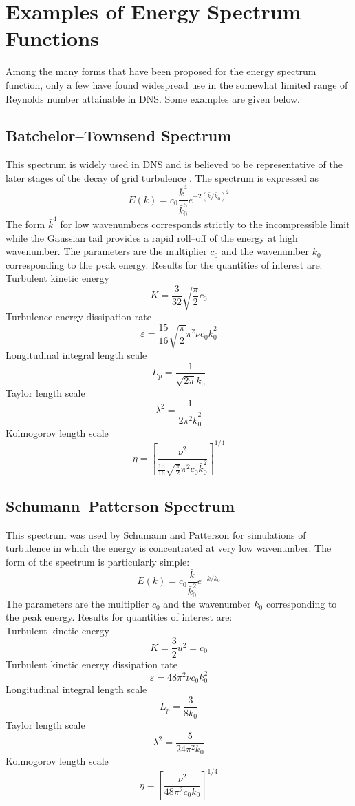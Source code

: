 \documentclass[dvips]{article}
\begin{document}
\section{Examples of Energy Spectrum Functions}
Among the many forms that have been proposed for the energy
spectrum function, only a few have found widespread use in the somewhat
limited range of Reynolds number attainable in DNS.  Some
examples are given below.

\subsection{Batchelor--Townsend Spectrum}
This spectrum is widely used in DNS and is believed to be
representative of the later stages of the decay of grid turbulence
\cite{batchelortownsend}.  The spectrum is expressed as
\begin{equation}
E(k) =
c_{0}\frac{\bar{k}^{4}}{\bar{k}_{0}^{5}}
e^{-2\left(\bar{k}/\bar{k}_{0}\right)^{2}}
\end{equation}
The form $\bar{k}^{4}$ for low
wavenumbers corresponds strictly to the incompressible limit \cite{batchelor53}
while the Gaussian tail provides a rapid roll--off of the energy at high
wavenumber.  The parameters are the multiplier $c_{0}$
and the wavenumber $\bar{k}_{0}$ corresponding to the peak energy.
Results for the quantities of interest are:\\[1mm]
Turbulent kinetic energy
\[
K = \frac{3}{32}\sqrt{\frac{\pi}{2}}c_{0}
\]
Turbulence energy dissipation rate
\[
\varepsilon = \frac{15}{16}\sqrt{\frac{\pi}{2}}\pi^{2}\nu c_{0}\bar{k}_{0}^{2}
\]
Longitudinal integral length scale
\[
L_{p} = \frac{1}{\sqrt{2\pi}\bar{k}_{0}}
\]
Taylor length scale
\[
\lambda^{2} = \frac{1}{2\pi^{2}\bar{k}_{0}^{2}}
\]
Kolmogorov length scale
\[
\eta = \left[
\frac{\nu^{2}}{\frac{15}{16}\sqrt{\frac{\pi}{2}}\pi^{2} c_{0} \bar{k}_{0}^{2}}
\right]^{1/4}
\]

\subsection{Schumann--Patterson Spectrum}
This spectrum was used by Schumann and Patterson \cite{schupatt}
for simulations of turbulence in which the energy is
concentrated at very low wavenumber.  The form of the spectrum is
particularly simple:
\begin{equation}
E(k) = c_{0}\frac{\bar{k}}{\bar{k}_{0}^{2}}e^{-\bar{k}/\bar{k}_{0}}
\end{equation}
The parameters are the multiplier $c_{0}$
and the wavenumber $k_{0}$ corresponding to the peak energy.
Results for quantities of interest are:\\[1mm]
Turbulent kinetic energy
\[
K = \frac{3}{2}u^{2} = c_{0}
\]
Turbulent kinetic energy dissipation rate
\[
\varepsilon = 48\pi^{2}\nu c_{0}k_{0}^{2}
\]
Longitudinal integral length scale
\[
L_{p} = \frac{3}{8k_{0}}
\]
Taylor length scale
\[
\lambda^{2} = \frac{5}{24\pi^{2}k_{0}}
\]
Kolmogorov length scale
\[
\eta = 
\left[ \frac{\nu^{2}}{48\pi^{2}c_{0}k_{0}} \right]^{1/4}
\]
\end{document}
